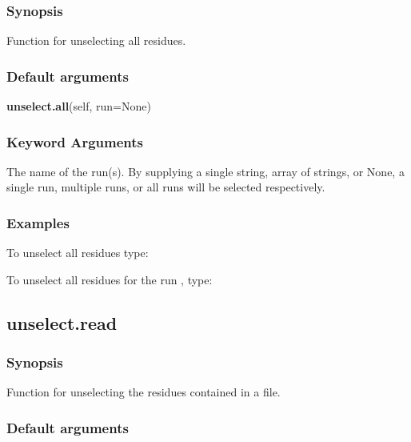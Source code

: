\subsubsection{Synopsis}

Function for unselecting all residues.

\subsubsection{Default arguments}

\textsf{\textbf{unselect.all}(self, run=None)}


\subsubsection{Keyword Arguments}

  The name of the run(s).  By supplying a single string, array of strings, or None, a single run, multiple runs, or all runs will be selected respectively.

\subsubsection{Examples}

To unselect all residues type:




To unselect all residues for the run 
, type:





\newpage

\subsection{unselect.read}


\subsubsection{Synopsis}

Function for unselecting the residues contained in a file.

\subsubsection{Default arguments}

